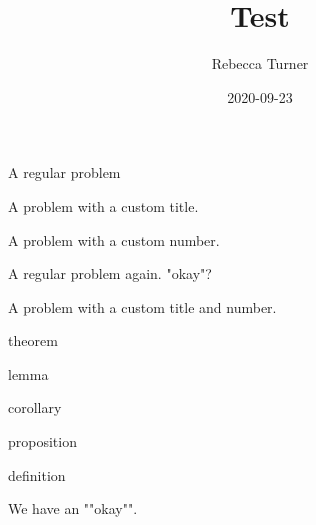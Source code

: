 \documentclass[knowledge, noxcolor]{mathnotes-hw}
\title{Test}
\author{Rebecca Turner}
\date{2020-09-23}
\begin{document}
\maketitle

\tableofcontents
\pagebreak

\begin{problem}
  A regular problem
\end{problem}

\begin{problem}[title=Euler's Theorem]
  A problem with a custom title.
\end{problem}

\begin{problem}[6]
  A problem with a custom number.
\end{problem}

\pagebreak
\begin{problem}
  A regular problem again. "okay"?
\end{problem}

\begin{problem}[title=Revenge of $\Z$, Hatcher 3.b]
  A problem with a custom title and number.
\end{problem}

\begin{thm}
  theorem
\end{thm}

\begin{lem}
  lemma
\end{lem}

\begin{cor}
  corollary
\end{cor}

\begin{prop}
  proposition
\end{prop}

\begin{defn}
  definition
\end{defn}

We have an ""okay"".
\end{document}
